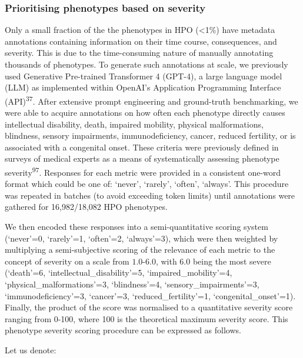 \documentclass[
]{article}
\begin{document}
\subsubsection{Prioritising phenotypes based on
severity}\label{prioritising-phenotypes-based-on-severity-1}

Only a small fraction of the the phenotypes in HPO (\textless1\%) have
metadata annotations containing information on their time course,
consequences, and severity. This is due to the time-consuming nature of
manually annotating thousands of phenotypes. To generate such
annotations at scale, we previously used Generative Pre-trained
Transformer 4 (GPT-4), a large language model (LLM) as implemented
within OpenAI's Application Programming Interface
(API)\textsuperscript{37}. After extensive prompt engineering and
ground-truth benchmarking, we were able to acquire annotations on how
often each phenotype directly causes intellectual disability, death,
impaired mobility, physical malformations, blindness, sensory
impairments, immunodeficiency, cancer, reduced fertility, or is
associated with a congenital onset. These criteria were previously
defined in surveys of medical experts as a means of systematically
assessing phenotype severity\textsuperscript{97}. Responses for each
metric were provided in a consistent one-word format which could be one
of: `never', `rarely', `often', `always'. This procedure was repeated in
batches (to avoid exceeding token limits) until annotations were
gathered for 16,982/18,082 HPO phenotypes.

We then encoded these responses into a semi-quantitative scoring system
(`never'=0, `rarely'=1, `often'=2, `always'=3), which were then weighted
by multiplying a semi-subjective scoring of the relevance of each metric
to the concept of severity on a scale from \(1.0\)-\(6.0\), with \(6.0\)
being the most severe (`death'=6, `intellectual\_disability'=5,
`impaired\_mobility'=4, `physical\_malformations'=3, `blindness'=4,
`sensory\_impairments'=3, `immunodeficiency'=3, `cancer'=3,
`reduced\_fertility'=1, `congenital\_onset'=1). Finally, the product of
the score was normalised to a quantitative severity score ranging from
0-100, where 100 is the theoretical maximum severity score. This
phenotype severity scoring procedure can be expressed as follows.

Let us denote:
\end{document}
